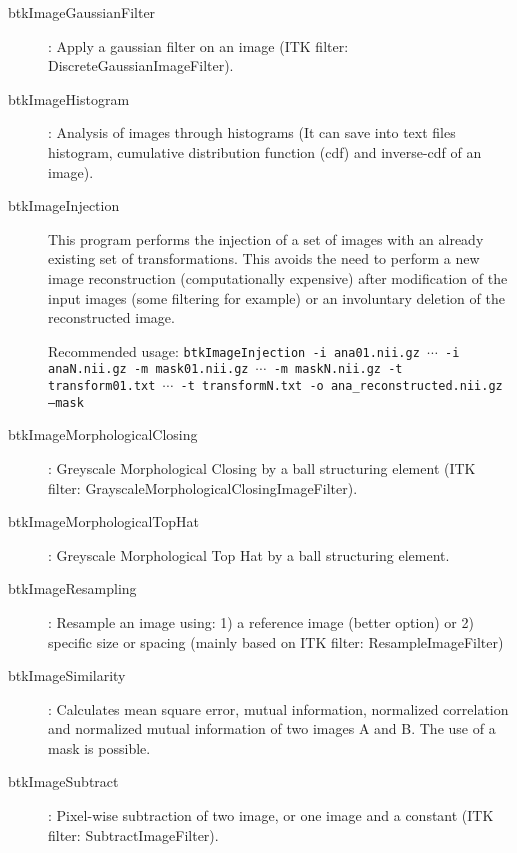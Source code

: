 \begin{description}
\item[btkImageGaussianFilter]: Apply a gaussian filter on an image (ITK filter: DiscreteGaussianImageFilter).
\item[btkImageHistogram]: Analysis of images through histograms (It can save into text files histogram, cumulative distribution function (cdf) and inverse-cdf of an image).
\item[btkImageInjection] This program performs the injection of a set
of images with an already existing set of transformations. This avoids the need
to perform a new image reconstruction (computationally expensive) after
modification of the input images (some filtering for example) or an involuntary
deletion of the reconstructed image.

Recommended usage: \texttt{btkImageInjection -i ana01.nii.gz $\cdots$ -i
anaN.nii.gz -m mask01.nii.gz $\cdots$ -m maskN.nii.gz -t transform01.txt $\cdots$ -t
transformN.txt -o ana\_reconstructed.nii.gz --mask}

\item[btkImageMorphologicalClosing]: Greyscale Morphological Closing by a ball structuring element (ITK filter: GrayscaleMorphologicalClosingImageFilter).
\item[btkImageMorphologicalTopHat]: Greyscale Morphological Top Hat by a ball structuring element.
\item[btkImageResampling]: Resample an image using: 1) a reference image (better option) or 2) specific size or spacing (mainly based on ITK filter: ResampleImageFilter)
\item[btkImageSimilarity]: Calculates mean square error, mutual information, normalized correlation and normalized mutual information of two images A and B. The use of a mask is possible.
\item[btkImageSubtract]: Pixel-wise subtraction of two image, or one image and a constant (ITK filter: SubtractImageFilter). 


\end{description}
